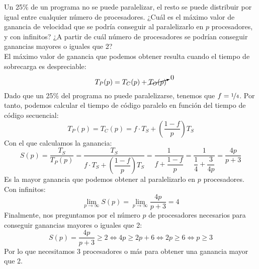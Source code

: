 \begin{ejercicio}
    Un 25\% de un programa no se puede paralelizar, el resto se puede distribuir por igual entre
    cualquier número de procesadores. ¿Cuál es el máximo valor de ganancia de velocidad que se podría
    conseguir al paralelizarlo en $p$ procesadores, y con infinitos? ¿A partir de cuál número de procesadores se
    podrían conseguir ganancias mayores o iguales que 2?\\

    El máximo valor de ganancia que podemos obtener resulta cuando el tiempo de sobrecarga es despreciable:
    \begin{equation*}
        T_P(p) = T_C(p) + \cancelto{0}{T_O(p)}
    \end{equation*}
    Dado que un 25\% del programa no puede paralelizarse, tenemos que $f=\nicefrac{1}{4}$. Por tanto, podemos calcular el tiempo de código paralelo en función del tiempo de código secuencial:
    \begin{equation*}
        T_P(p) = T_C(p) = f\cdot T_S + \left(\dfrac{1-f}{p}\right)T_S
    \end{equation*}
    Con el que calculamos la ganancia:
    \begin{equation*}
        S(p) = \dfrac{T_S}{T_P(p)} = \dfrac{T_S}{f\cdot T_S + \left(\dfrac{1-f}{p}\right)T_S} = \dfrac{1}{f+\dfrac{1-f}{p}} = \dfrac{1}{\dfrac{1}{4}+\dfrac{3}{4p}} = \dfrac{4p}{p+3}
    \end{equation*}
    Es la mayor ganancia que podemos obtener al paralelizarlo en $p$ procesadores. Con infinitos:
    \begin{equation*}
        \lim_{p\to\infty}S(p) = \lim_{p\to\infty}\dfrac{4p}{p+3} = 4
    \end{equation*}
    Finalmente, nos preguntamos por el número $p$ de procesadores necesarios para conseguir ganancias mayores o iguales que 2:
    \begin{equation*}
        S(p) = \dfrac{4p}{p+3} \geq 2 \Longleftrightarrow 4p\geq 2p+6\Longleftrightarrow 2p\geq 6 \Longleftrightarrow p\geq 3
    \end{equation*}
    Por lo que necesitamos 3 procesadores o más para obtener una ganancia mayor que 2.
\end{ejercicio}

